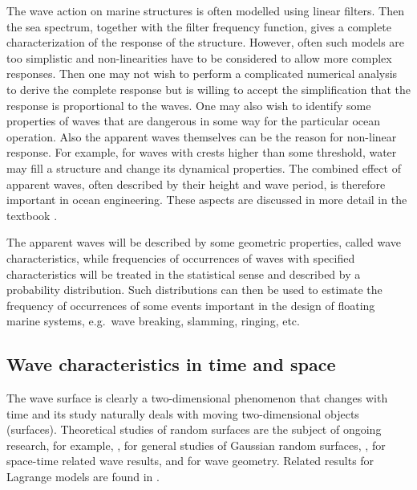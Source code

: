 The wave action on marine structures is often modelled using linear filters.
Then the sea spectrum, together with the filter frequency function,
gives a complete characterization of the response
of the structure. However, often such models are too simplistic
and non-linearities have to be considered to allow more complex responses.
Then one may not wish to perform a complicated numerical
analysis to derive the complete response but is willing to accept
the simplification that the response is proportional to the waves.
One may also wish to identify some properties of waves that are dangerous
in some way for the particular ocean operation.
Also the apparent waves themselves can be the reason for non-linear response.
For example, for waves with crests higher than some
threshold, water may fill a structure and change its dynamical properties.
The combined effect of apparent waves, often described by their
height and wave period, is therefore important in ocean engineering.
These aspects are discussed in more detail in
the textbook \cite{Ochi1998Ocean}.

The apparent waves will be described by some geometric properties,
called wave characteristics, while frequencies of
occurrences of waves with specified characteristics will be treated in the
statistical sense and described by a probability distribution. Such
distributions can then be used to estimate the frequency of occurrences
of some events important in the design of floating marine systems,
e.g.\ wave breaking, slamming, ringing, etc.

\subsection{Wave characteristics in time and space}
The wave surface is clearly a two-dimensional phenomenon that changes
with time and its study naturally deals with moving two-dimensional
objects (surfaces). Theoretical studies of random surfaces are the 
subject of ongoing research, for example,
\cite{AzaisWschebor2009,Mercardier2006},
for general studies of Gaussian random surfaces, 
\cite{Aberg2007diss,AbergRychlikLeadbetter2008,BaxevaniEtal2003Velocities,
BaxevaniRychlik2006,PodgorskiEtal2000Statistics,Sjo2000Crossing,Sjo2001Simultaneous}, 
for space-time related wave results, and \cite{PodgorskiRychlik2016SizeOfWaves} 
for wave geometry. 
Related results for Lagrange models are found in
\cite{AbergLindgren2008,Lindgren2006,Lindgren2009,Lindgren2010a,
LindgrenAberg2009,Lindgrenetal2010}.

